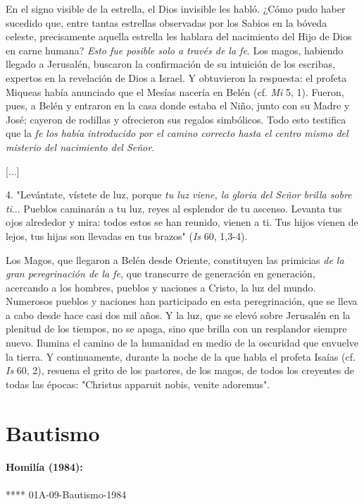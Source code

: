 \begin{body}
En el signo visible de la estrella, el Dios invisible les habló. ¿Cómo pudo haber sucedido que, entre tantas estrellas observadas por los Sabios en la bóveda celeste, precisamente aquella estrella les hablara del nacimiento del Hijo de Dios en carne humana? \emph{Esto fue posible solo a través de la fe}. Los magos, habiendo llegado a Jerusalén, buscaron la confirmación de su intuición de los escribas, expertos en la revelación de Dios a Israel. Y obtuvieron la respuesta: el profeta Miqueas había anunciado que el Mesías nacería en Belén (cf. \emph{Mi} 5, 1). Fueron, pues, a Belén y entraron en la casa donde estaba el Niño, junto con su Madre y José; cayeron de rodillas y ofrecieron sus regalos simbólicos. Todo esto testifica que la \emph{fe los había introducido por el camino correcto hasta el centro mismo del misterio del nacimiento del Señor}.

{[}...{]}

4. "Levántate, vístete de luz, porque \emph{tu luz viene, la gloria del Señor brilla sobre ti}... Pueblos caminarán a tu luz, reyes al esplendor de tu ascenso. Levanta tus ojos alrededor y mira: todos estos se han reunido, vienen a ti. Tus hijos vienen de lejos, tus hijas son llevadas en tus brazos" (\emph{Is} 60, 1,3-4).

Los Magos, que llegaron a Belén desde Oriente, constituyen las primicias \emph{de la gran peregrinación de la fe}, que transcurre de generación en generación, acercando a los hombres, pueblos y naciones a Cristo, la luz del mundo. Numerosos pueblos y naciones han participado en esta peregrinación, que se lleva a cabo desde hace casi dos mil años. Y la luz, que se elevó sobre Jerusalén en la plenitud de los tiempos, no se apaga, sino que brilla con un resplandor siempre nuevo. Ilumina el camino de la humanidad en medio de la oscuridad que envuelve la tierra. Y continuamente, durante la noche de la que habla el profeta Isaías (cf. \emph{Is} 60, 2), resuena el grito de los pastores, de los magos, de todos los creyentes de todas las épocas: "Christus apparuit nobis, venite adoremus".

\chapter{Bautismo}

\subsubsection{Homilía (1984): } **** 01A-09-Bautismo-1984


\end{body}
